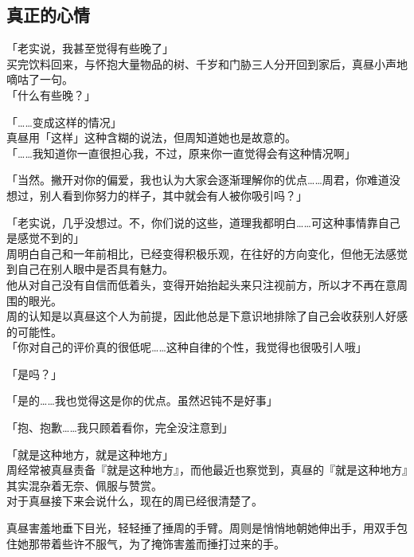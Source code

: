 \subsection{真正的心情}

「老实说，我甚至觉得有些晚了」\\

买完饮料回来，与怀抱大量物品的树、千岁和门胁三人分开回到家后，真昼小声地嘀咕了一句。\\

「什么有些晚？」

「……变成这样的情况」\\

真昼用「这样」这种含糊的说法，但周知道她也是故意的。\\

「……我知道你一直很担心我，不过，原来你一直觉得会有这种情况啊」

「当然。撇开对你的偏爱，我也认为大家会逐渐理解你的优点……周君，你难道没想过，别人看到你努力的样子，其中就会有人被你吸引吗？」

「老实说，几乎没想过。不，你们说的这些，道理我都明白……可这种事情靠自己是感觉不到的」\\

周明白自己和一年前相比，已经变得积极乐观，在往好的方向变化，但他无法感觉到自己在别人眼中是否具有魅力。\\

他从对自己没有自信而低着头，变得开始抬起头来只注视前方，所以才不再在意周围的眼光。\\

周的认知是以真昼这个人为前提，因此他总是下意识地排除了自己会收获别人好感的可能性。\\

「你对自己的评价真的很低呢……这种自律的个性，我觉得也很吸引人哦」

「是吗？」

「是的……我也觉得这是你的优点。虽然迟钝不是好事」

「抱、抱歉……我只顾着看你，完全没注意到」

「就是这种地方，就是这种地方」\\

周经常被真昼责备『就是这种地方』，而他最近也察觉到，真昼的『就是这种地方』其实混杂着无奈、佩服与赞赏。\\

对于真昼接下来会说什么，现在的周已经很清楚了。

真昼害羞地垂下目光，轻轻捶了捶周的手臂。周则是悄悄地朝她伸出手，用双手包住她那带着些许不服气，为了掩饰害羞而捶打过来的手。\\

